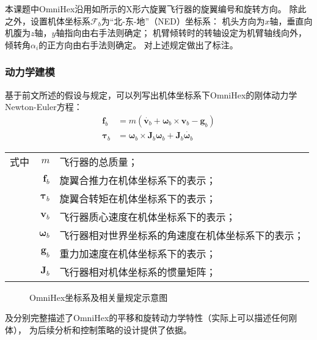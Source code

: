 本课题中OmniHex沿用如所示的X形六旋翼飞行器的旋翼编号和旋转方向。
除此之外，设置机体坐标系$\mathscr{F}_b$为“北-东-地”（NED）坐标系：
机头方向为$x$轴，垂直向机腹为$z$轴，$y$轴指向由右手法则确定；
机臂倾转时的转轴设定为机臂轴线向外，倾转角$\alpha_i$的正方向由右手法则确定。
对上述规定做出了标注。

\subsubsection{动力学建模}\label{subsubsec:dynamic_modeling}
基于前文所述的假设与规定，可以列写出机体坐标系下OmniHex的刚体动力学Newton-Euler方程：
\begin{align}
    \bm{f}_b &= m(\dot{\bm{v}_b} + \bm{\omega}_b \times \bm{v}_b - \bm{g}_b) \label{equ:newton_equation} \\
    \bm{\tau}_b &= \bm{\omega}_b \times \bm{J}_b\bm{\omega}_b + \bm{J}_b\dot{\bm{\omega}_b} \label{equ:euler_equation}
\end{align}
\begin{tabularx}{\textwidth}{@{}l@{\quad}r@{———}X@{}}
    式中& $m$ &飞行器的总质量；\\
       & $\bm{f}_b$ &旋翼合推力在机体坐标系下的表示；\\
       & $\bm{\tau}_b$ &旋翼合转矩在机体坐标系下的表示；\\
       & $\bm{v}_b$ &飞行器质心速度在机体坐标系下的表示；\\
       & $\bm{\omega}_b$ &飞行器相对世界坐标系的角速度在机体坐标系下的表示；\\
       & $\bm{g}_b$ &重力加速度在机体坐标系下的表示；\\
       & $\bm{J}_b$ &飞行器相对机体坐标系的惯量矩阵；
\end{tabularx}\vspace{3.15bp}
\begin{figure}[!ht]
    \setlength{\subfigcapskip}{-1bp}
    \centering
    \begin{minipage}{\textwidth}
    \centering
    \subfigure{\label{fig:basic_definition_1}}\addtocounter{subfigure}{-2}
    \hspace{0.2em}
    \subfigure{\label{fig:basic_definition_2}}\addtocounter{subfigure}{-2}
    \end{minipage}
    \caption{OmniHex坐标系及相关量规定示意图\label{fig:basic_definition}}
\end{figure}
及分别完整描述了OmniHex的平移和旋转动力学特性（实际上可以描述任何刚体），
为后续分析和控制策略的设计提供了依据。

